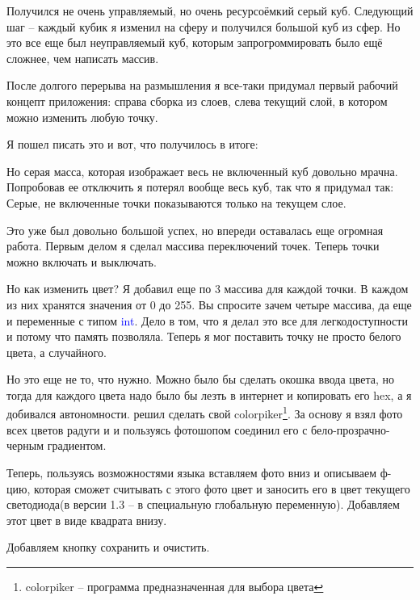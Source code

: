 \documentclass[a4paper, 12pt]{article}
\begin{document}
Получился не очень управляемый, но очень ресурсоёмкий серый куб. Следующий шаг
-- каждый кубик я изменил на сферу и получился большой куб из сфер.
Но это все еще был неуправляемый куб, которым запрогроммировать было ещё 
сложнее, чем написать массив. 

После долгого перерыва на размышления я все-таки придумал первый рабочий
концепт приложения: справа сборка из слоев, слева текущий слой, в котором
можно изменить любую точку. 

Я пошел писать это и вот, что получилось в итоге:


Но серая масса, которая изображает весь не включенный куб довольно мрачна.
Попробовав ее отключить я потерял вообще весь куб, так что я придумал так:
Серые, не включенные точки показываются только на текущем слое. 


Это уже был довольно большой успех, но впереди оставалась еще огромная работа.
Первым делом я сделал массива переключений точек. Теперь точки можно включать и
выключать. 


Но как изменить цвет? Я добавил еще по 3 массива для каждой точки. В каждом из 
них хранятся значения от 0 до 255. Вы спросите зачем четыре массива, да еще и
переменные с типом \textcolor{blue}{int}. Дело в том, что я делал это все для
легкодоступности и потому что память позволяла. Теперь я мог поставить точку 
не просто белого цвета, а случайного.


Но это еще не то, что нужно. Можно было бы сделать окошка ввода цвета, но тогда
для каждого цвета надо было бы лезть в интернет и копировать его hex, а я 
добивался автономности. решил сделать свой colorpiker\footnote{colorpiker -- 
программа предназначенная для выбора цвета}. За основу я взял фото всех цветов
радуги и и пользуясь фотошопом соединил его с бело-прозрачно-черным градиентом.
 

Теперь, пользуясь возможностями языка вставляем фото вниз и описываем ф-цию,
которая сможет считывать с этого фото цвет и заносить его в цвет текущего 
светодиода(в версии 1.3 -- в специальную глобальную переменную). Добавляем 
этот цвет в виде квадрата внизу.


Добавляем кнопку сохранить и очистить.
\end{document}
